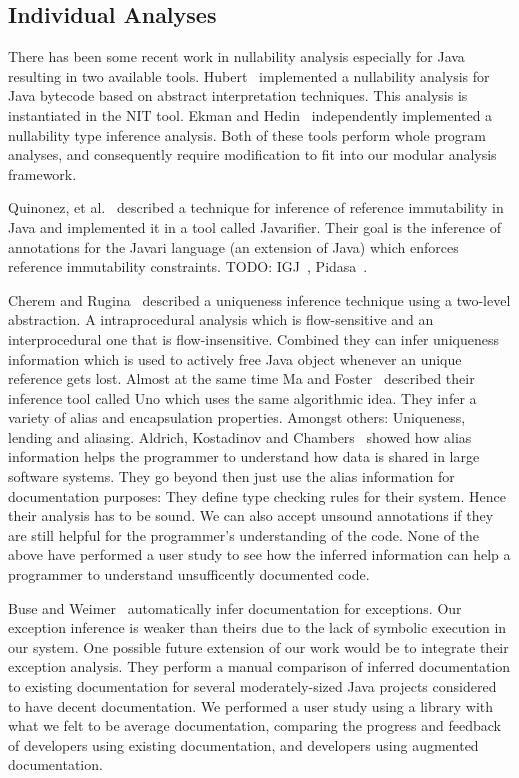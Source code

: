 \subsection{Individual Analyses}

There has been some recent work in nullability analysis especially for Java
resulting in two available tools.  Hubert~\cite{NIT} implemented a nullability
analysis for Java bytecode based on abstract interpretation techniques.  This
analysis is instantiated in the {\sc NIT} tool.  Ekman and
Hedin~\cite{NonNullTypeInference} independently implemented a nullability type
inference analysis.  Both of these tools perform whole program analyses, and
consequently require modification to fit into our modular analysis framework.

Quinonez, et al.~\cite{Javarifier} described a technique for inference of
reference immutability in Java and implemented it in a tool called {\sc
  Javarifier}. Their goal is the inference of annotations for the {\sc Javari}
language (an extension of Java) which enforces reference immutability
constraints. TODO: IGJ~\cite{IGJ}, Pidasa~\cite{Pidasa}.

Cherem and Rugina~\cite{UniquenessInference} described a uniqueness inference
technique using a two-level abstraction. A intraprocedural analysis which is
flow-sensitive and an interprocedural one that is flow-insensitive. Combined
they can infer uniqueness information which is used to actively free Java
object whenever an unique reference gets lost.  Almost at the same time Ma and
Foster~\cite{Uno} described their inference tool called Uno which uses the same
algorithmic idea. They infer a variety of alias and encapsulation
properties. Amongst others: Uniqueness, lending and aliasing.  Aldrich,
Kostadinov and Chambers~\cite{AliasJava} showed how alias information helps the
programmer to understand how data is shared in large software systems.
They go beyond then just use the alias information for documentation purposes:
They define type checking rules for their system. Hence their analysis has to be
sound. We can also accept unsound annotations if they are still helpful for the 
programmer's understanding of the code. None of the above
have performed a user study to see how the inferred information can help a
programmer to understand unsufficently documented code.

Buse and Weimer~\cite{autodoc} automatically infer documentation for
exceptions.  Our exception inference is weaker than theirs due to the lack of
symbolic execution in our system.  One
possible future extension of our work would be to integrate their exception
analysis.  They perform a manual comparison of inferred documentation to
existing documentation for several moderately-sized Java projects considered to
have decent documentation.  We performed a user study using a library with what
we felt to be average documentation, comparing the progress and feedback of
developers using existing documentation, and developers using augmented
documentation.
